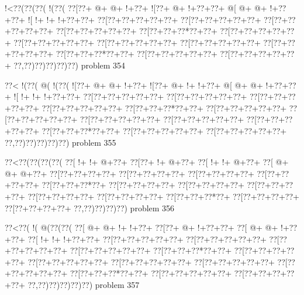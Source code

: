 \vbox{\vbox{\goo
\- !<\0??(\0??(\0??(\- !(\0??(
\0??[\0??+\- @+\- @+\- !+\0??+
\- ![\0??+\- @+\- !+\0??+\0??+
\- @[\- @+\- @+\- !+\0??+\0??+
\- ![\- !+\- !+\- !+\0??+\0??+
\0??[\0??+\0??+\0??+\0??+\0??+
\0??[\0??+\0??+\0??+\0??+\0??+
\0??[\0??+\0??+\0??+\0??+\0??+
\0??[\0??+\0??+\0??+\0??+\0??+
\0??[\0??+\0??+\0??*\0??+\0??+
\0??[\0??+\0??+\0??+\0??+\0??+
\0??[\0??+\0??+\0??+\0??+\0??+
\0??[\0??+\0??+\0??+\0??+\0??+
\0??[\0??+\0??+\0??+\0??+\0??+
\0??[\0??+\0??+\0??+\0??+\0??+
\0??[\0??+\0??+\0??*\0??+\0??+
\0??[\0??+\0??+\0??+\0??+\0??+
\0??[\0??+\0??+\0??+\0??+\0??+
\0??,\0??)\0??)\0??)\0??)\0??)
}
\hfil problem 354\hfil\break
}

\vbox{\vbox{\goo
\0??<\- !(\0??(\- @(\- !(\0??(
\- ![\0??+\- @+\- @+\- !+\0??+
\- ![\0??+\- @+\- !+\- !+\0??+
\- @[\- @+\- @+\- !+\0??+\0??+
\- ![\- !+\- !+\- !+\0??+\0??+
\0??[\0??+\0??+\0??+\0??+\0??+
\0??[\0??+\0??+\0??+\0??+\0??+
\0??[\0??+\0??+\0??+\0??+\0??+
\0??[\0??+\0??+\0??+\0??+\0??+
\0??[\0??+\0??+\0??*\0??+\0??+
\0??[\0??+\0??+\0??+\0??+\0??+
\0??[\0??+\0??+\0??+\0??+\0??+
\0??[\0??+\0??+\0??+\0??+\0??+
\0??[\0??+\0??+\0??+\0??+\0??+
\0??[\0??+\0??+\0??+\0??+\0??+
\0??[\0??+\0??+\0??*\0??+\0??+
\0??[\0??+\0??+\0??+\0??+\0??+
\0??[\0??+\0??+\0??+\0??+\0??+
\0??,\0??)\0??)\0??)\0??)\0??)
}
\hfil problem 355\hfil\break
}

\vbox{\vbox{\goo
\0??<\0??(\0??(\0??(\0??(
\0??[\- !+\- !+\- @+\0??+
\0??[\0??+\- !+\- @+\0??+
\0??[\- !+\- !+\- @+\0??+
\0??[\- @+\- @+\- @+\0??+
\0??[\0??+\0??+\0??+\0??+
\0??[\0??+\0??+\0??+\0??+
\0??[\0??+\0??+\0??+\0??+
\0??[\0??+\0??+\0??+\0??+
\0??[\0??+\0??+\0??*\0??+
\0??[\0??+\0??+\0??+\0??+
\0??[\0??+\0??+\0??+\0??+
\0??[\0??+\0??+\0??+\0??+
\0??[\0??+\0??+\0??+\0??+
\0??[\0??+\0??+\0??+\0??+
\0??[\0??+\0??+\0??*\0??+
\0??[\0??+\0??+\0??+\0??+
\0??[\0??+\0??+\0??+\0??+
\0??,\0??)\0??)\0??)\0??)
}
\hfil problem 356\hfil\break
}

\vbox{\vbox{\goo
\0??<\0??(\- !(\- @(\0??(\0??(
\0??[\- @+\- @+\- !+\- !+\0??+
\0??[\0??+\- @+\- !+\0??+\0??+
\0??[\- @+\- @+\- !+\0??+\0??+
\0??[\- !+\- !+\- !+\0??+\0??+
\0??[\0??+\0??+\0??+\0??+\0??+
\0??[\0??+\0??+\0??+\0??+\0??+
\0??[\0??+\0??+\0??+\0??+\0??+
\0??[\0??+\0??+\0??+\0??+\0??+
\0??[\0??+\0??+\0??*\0??+\0??+
\0??[\0??+\0??+\0??+\0??+\0??+
\0??[\0??+\0??+\0??+\0??+\0??+
\0??[\0??+\0??+\0??+\0??+\0??+
\0??[\0??+\0??+\0??+\0??+\0??+
\0??[\0??+\0??+\0??+\0??+\0??+
\0??[\0??+\0??+\0??*\0??+\0??+
\0??[\0??+\0??+\0??+\0??+\0??+
\0??[\0??+\0??+\0??+\0??+\0??+
\0??,\0??)\0??)\0??)\0??)\0??)
}
\hfil problem 357\hfil\break
}

